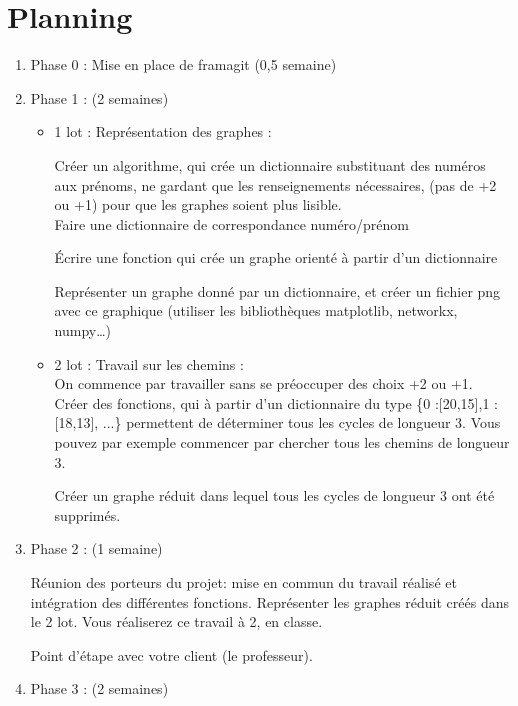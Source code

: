 \documentclass[12pt]{article}
\begin{document}
       
\section{Planning}

\begin{enumerate}

\item Phase 0 : Mise en place de framagit (0,5 semaine)

\medskip

\item Phase 1 : (2 semaines)
\begin{itemize}

\item [\textbullet] 1\ier{} lot : Représentation des graphes :

Créer un algorithme, qui crée un dictionnaire substituant des numéros aux prénoms, ne gardant que les renseignements nécessaires, (pas de +2 ou +1) pour que les graphes soient plus lisible. \\
Faire une dictionnaire de correspondance numéro/prénom

Écrire une fonction qui crée un graphe orienté à partir d’un dictionnaire

Représenter un graphe donné par un dictionnaire, et créer un fichier png avec ce graphique (utiliser les bibliothèques matplotlib, networkx, numpy…)
\medskip
\item [\textbullet]2\ieme{} lot : Travail sur les chemins : \\
On commence par travailler sans se préoccuper des choix +2 ou +1. \\
Créer des fonctions, qui à partir d’un dictionnaire du type \{0 :[20,15],1 :[18,13], ...\} permettent de déterminer tous les cycles de longueur 3.  
Vous pouvez par exemple commencer par chercher tous les chemins de longueur 3.  


Créer un graphe réduit dans lequel tous les cycles de longueur 3 ont été supprimés.
\end{itemize}
\medskip
\item Phase 2 : (1 semaine)

Réunion des porteurs du projet: mise en commun du travail réalisé et intégration des différentes fonctions. Représenter les graphes réduit créés dans le 2\ieme{} lot.  
Vous réaliserez ce travail à 2, en classe.

Point d'étape avec votre client (le professeur).

\medskip
\item Phase 3 : (2 semaines)
\begin{itemize}



\end{itemize}
\end{enumerate}
\end{document}
